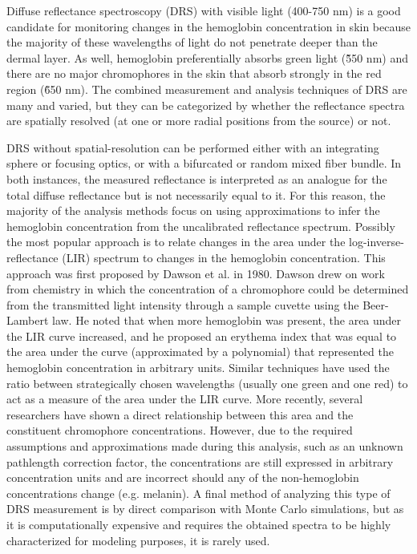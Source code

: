 Diffuse reflectance spectroscopy (DRS) with visible light (400-750 nm) is a good candidate for monitoring changes in the hemoglobin concentration in skin because the majority of these wavelengths of light do not penetrate deeper than the dermal layer.\cite{Richards-Kortum1996} As well, hemoglobin preferentially absorbs green light (\~550 nm) and there are no major chromophores in the skin that absorb strongly in the red region (\~650 nm).\cite{Prahl2001} The combined measurement and analysis techniques of DRS are many and varied,\cite{Palmer2006} but they can be categorized by whether the reflectance spectra are spatially resolved (at one or more radial positions from the source) or not.

DRS without spatial-resolution can be performed either with an integrating sphere or focusing optics, or with a bifurcated or random mixed fiber bundle.\cite{Stamatas2004} In both instances, the measured reflectance is interpreted as an analogue for the total diffuse reflectance but is not necessarily equal to it. For this reason, the majority of the analysis methods focus on using approximations to infer the hemoglobin concentration from the uncalibrated reflectance spectrum. Possibly the most popular approach is to relate changes in the area under the log-inverse-reflectance (LIR) spectrum to changes in the hemoglobin concentration. This approach was first proposed by Dawson et al. in 1980.\cite{Dawson1980} Dawson drew on work from chemistry in which the concentration of a chromophore could be determined from the transmitted light intensity through a sample cuvette using the Beer-Lambert law. He noted that when more hemoglobin was present, the area under the LIR curve increased, and he proposed an erythema index that was equal to the area under the curve (approximated by a polynomial) that represented the hemoglobin concentration in arbitrary units. Similar techniques have used the ratio between strategically chosen wavelengths (usually one green and one red) to act as a measure of the area under the LIR curve.\cite{Diffey1984,Lock-Andersen1998,Bodekaer2013} More recently, several researchers have shown a direct relationship between this area and the constituent chromophore concentrations.\cite{Stamatas2008,Kollias2010} However, due to the required assumptions and approximations made during this analysis, such as an unknown pathlength correction factor, the concentrations are still expressed in arbitrary concentration units and are incorrect should any of the non-hemoglobin concentrations change (e.g. melanin). A final method of analyzing this type of DRS measurement is by direct comparison with Monte Carlo simulations,\cite{Meglinski2002,Yu2008} but as it is computationally expensive and requires the obtained spectra to be highly characterized for modeling purposes, it is rarely used.

